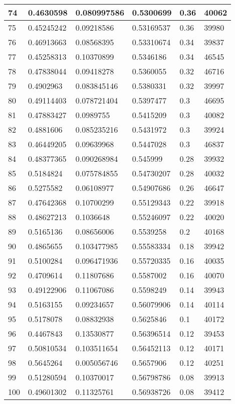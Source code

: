 \begin{longtable}{|l|l|l|l|l|l|}
74 & 0.4630598 & 0.080997586 & 0.5300699 & 0.36 & 40062 \\ \hline 
75 & 0.45245242 & 0.09218586 & 0.53169537 & 0.36 & 39980 \\ \hline 
76 & 0.46913663 & 0.08568395 & 0.53310674 & 0.34 & 39837 \\ \hline 
77 & 0.45258313 & 0.10370899 & 0.5346186 & 0.34 & 46545 \\ \hline 
78 & 0.47838044 & 0.09418278 & 0.5360055 & 0.32 & 46716 \\ \hline 
79 & 0.4902963 & 0.083845146 & 0.5380331 & 0.32 & 39997 \\ \hline 
80 & 0.49114403 & 0.078721404 & 0.5397477 & 0.3 & 46695 \\ \hline 
81 & 0.47883427 & 0.0989755 & 0.5415209 & 0.3 & 40082 \\ \hline 
82 & 0.4881606 & 0.085235216 & 0.5431972 & 0.3 & 39924 \\ \hline 
83 & 0.46449205 & 0.09639968 & 0.5447028 & 0.3 & 46837 \\ \hline 
84 & 0.48377365 & 0.090268984 & 0.545999 & 0.28 & 39932 \\ \hline 
85 & 0.5184824 & 0.075784855 & 0.54730207 & 0.28 & 40032 \\ \hline 
86 & 0.5275582 & 0.06108977 & 0.54907686 & 0.26 & 46647 \\ \hline 
87 & 0.47642368 & 0.10700299 & 0.55129343 & 0.22 & 39918 \\ \hline 
88 & 0.48627213 & 0.1036648 & 0.55246097 & 0.22 & 40020 \\ \hline 
89 & 0.5165136 & 0.08656006 & 0.5539258 & 0.2 & 40168 \\ \hline 
90 & 0.4865655 & 0.103477985 & 0.55583334 & 0.18 & 39942 \\ \hline 
91 & 0.5100284 & 0.096471936 & 0.55720335 & 0.16 & 40035 \\ \hline 
92 & 0.4709614 & 0.11807686 & 0.5587002 & 0.16 & 40070 \\ \hline 
93 & 0.49122906 & 0.11067086 & 0.5598249 & 0.14 & 39943 \\ \hline 
94 & 0.5163155 & 0.09234657 & 0.56079906 & 0.14 & 40114 \\ \hline 
95 & 0.5178078 & 0.08832938 & 0.5625846 & 0.1 & 40172 \\ \hline 
96 & 0.4467843 & 0.13530877 & 0.56396514 & 0.12 & 39453 \\ \hline 
97 & 0.50810534 & 0.103511654 & 0.56452113 & 0.12 & 40171 \\ \hline 
98 & 0.5645264 & 0.005056746 & 0.5657906 & 0.12 & 40251 \\ \hline 
99 & 0.51280594 & 0.10370017 & 0.56798786 & 0.08 & 39913 \\ \hline 
100 & 0.49601302 & 0.11325761 & 0.56938726 & 0.08 & 39412 \\ \hline 
\end{longtable}